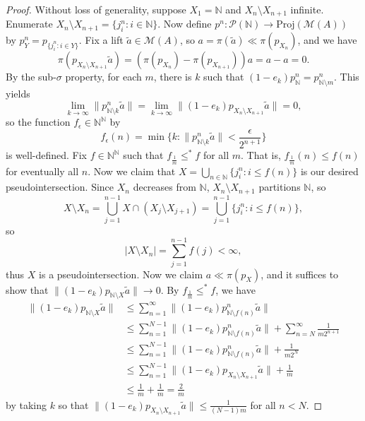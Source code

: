 \documentclass[10pt]{amsart}
\theoremstyle{definition}
\newcommand{\Proj}{\mathrm{Proj}}
\begin{document}
\begin{proof}
    Without loss of generality, suppose $X_1=\mathbb{N}$ and $X_n\setminus X_{n+1}$ infinite. Enumerate $X_n\setminus X_{n+1}=\{j^n_i:i\in\mathbb{N}\}$. Now define $p^n:\mathscr{P}(\mathbb{N})\rightarrow \Proj(\mathscr{M}(A))$ by $p^n_Y=p_{\{j^n_i:i\in Y\}}$. Fix a lift $\tilde{a}\in\mathscr{M}(A)$, so $a=\pi(\tilde{a})\ll\pi(p_{X_n})$, and we have 
    \[\pi(p_{X_n\setminus X_{n+1}}\tilde{a})=(\pi(p_{X_n})-\pi(p_{X_{n+1}}))a=a-a=0.\]
    By the sub-$\sigma$ property, for each $m$, there is $k$ such that $(1-e_k)p^n_{\mathbb{N}}=p^n_{\mathbb{N}\setminus m}$. This yields
    \[\lim_{k\rightarrow\infty}\|p^n_{\mathbb{N}\setminus k}\tilde{a}\|=\lim_{k\rightarrow\infty}\|(1-e_k)p_{X_n\setminus X_{n+1}}\tilde{a}\|=0,\]
    so the function $f_\epsilon\in\mathbb{N}^\mathbb{N}$ by
    \[f_\epsilon(n)=\min\Big\{k:\|p^n_{\mathbb{N}\setminus k}\tilde{a}\|<\frac{\epsilon}{2^{n+1}}\Big\}\]
    is well-defined. Fix $f\in\mathbb{N}^\mathbb{N}$ such that $f_\frac{1}{m}\leq^*f$ for all $m$. That is, $f_\frac{1}{m}(n)\leq f(n)$ for eventually all $n$. Now we claim that $X=\bigcup_{n\in\mathbb{N}}\{j^n_i:i\leq f(n)\}$
    is our desired pseudointersection. Since $X_n$ decreases from $\mathbb{N}$, $X_n\setminus X_{n+1}$ partitions $\mathbb{N}$, so
    \[X\setminus X_n=\bigcup_{j=1}^{n-1}X\cap(X_j\setminus X_{j+1})=\bigcup_{j=1}^{n-1}\{j^n_i:i\leq f(n)\},\]
    so
    \[|X\setminus X_n|=\sum_{j=1}^{n-1}f(j)<\infty,\]
    thus $X$ is a pseudointersection. Now we claim $a\ll\pi(p_X)$, and it suffices to show that $\|(1-e_k)p_{\mathbb{N}\setminus X}\tilde{a}\|\rightarrow 0$. By $f_\frac{1}{m}\leq^*f$, we have
    \begin{align*}
        \|(1-e_k)p_{\mathbb{N}\setminus X}\tilde{a}\| &\leq  \sum_{n=1}^\infty\|(1-e_k)p^n_{\mathbb{N}\setminus f(n)}\tilde{a}\| \\
        &\leq \sum_{n=1}^{N-1}\|(1-e_k)p^n_{\mathbb{N}\setminus f(n)}\tilde{a}\|+\sum_{n=N}^\infty\frac{1}{m2^{n+1}} \\
        &\leq \sum_{n=1}^{N-1}\|(1-e_k)p^n_{\mathbb{N}\setminus f(n)}\tilde{a}\|+\frac{1}{m2^N} \\
        &\leq \sum_{n=1}^{N-1}\|(1-e_k)p_{X_n\setminus X_{n+1}}\tilde{a}\|+\frac{1}{m} \\
        &\leq \frac{1}{m}+\frac{1}{m}=\frac{2}{m}
    \end{align*}
    by taking $k$ so that $\|(1-e_k)p_{X_n\setminus X_{n+1}}\tilde{a}\|\leq\frac{1}{(N-1)m}$ for all $n< N$.
\end{proof}
\end{document}

